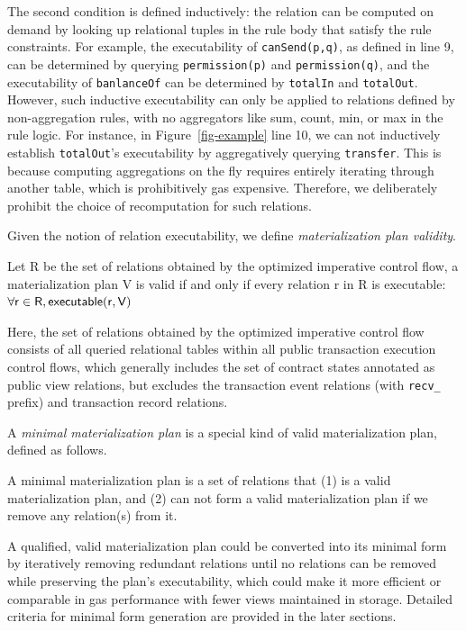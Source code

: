 The second condition is defined inductively: the relation can be computed on demand by looking up relational tuples in the rule body that satisfy the rule constraints. For example, the executability of {\sf \lstinline{canSend(p,q)}}, as defined in line 9, can be determined by querying {\sf \lstinline{permission(p)}} and {\sf \lstinline{permission(q)}}, and the executability of {\sf \lstinline{banlanceOf}} can be determined by {\sf \lstinline{totalIn}} and {\sf \lstinline{totalOut}}.
However, such inductive executability can only be applied to relations defined by non-aggregation rules, with no aggregators like sum, count, min, or max in the rule logic. For instance, in Figure~\ref{fig-example} line 10, we can not inductively establish {\sf \lstinline{totalOut}}'s executability by aggregatively querying {\sf \lstinline{transfer}}. This is because computing aggregations on the fly requires entirely iterating through another table,
which is prohibitively gas expensive. Therefore, we deliberately prohibit the choice of recomputation for such relations. 

Given the notion of relation executability, we define {\em materialization plan validity}.
\begin{deff}\label{def:valid-plan}
    Let {\sf R} be the set of relations obtained by the optimized imperative control flow,
    a materialization plan {\sf V} is valid if and only if every relation {\sf r} in {\sf R} is executable:
       $\forall {\sf r} \in {\sf R}, {\sf executable(r,V)}$
\end{deff}

Here, the set of relations obtained by the optimized imperative control flow consists of all queried
relational tables within all public transaction execution control flows,
which generally includes
the set of contract states annotated as public view relations,
but excludes the transaction event relations (with {\sf \lstinline{recv_}} prefix) and transaction record relations.

A {\em minimal materialization plan} is a special kind of valid materialization plan, defined as follows. 

\begin{deff}\label{def:min-plan}
A minimal materialization plan is a set of relations that (1) is a valid materialization plan, and (2) can not form a valid materialization plan if we remove any relation(s) from it.
    
\end{deff}

A qualified, valid materialization plan could be converted into its minimal form by iteratively removing redundant relations until no relations can be removed while preserving the plan's executability, which could make it more efficient or comparable in gas performance with fewer views maintained in storage. Detailed criteria for minimal form generation are provided in the later sections.